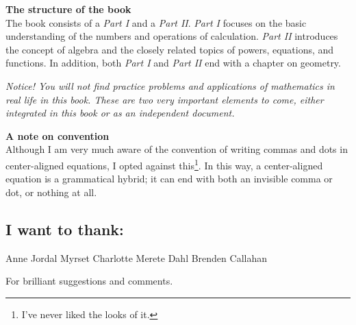 \textbf{The structure of the book}\\
The book consists of a \textsl{Part I} and a \textsl{Part II}. \textsl{Part I} focuses on the basic understanding of the numbers and operations of calculation. \textsl{Part II} introduces the concept of algebra and the closely related topics of powers, equations, and functions. In addition, both \textsl{Part I} and \textsl{Part II} end with a chapter on geometry. \vsk

\textit{Notice! 
You will not find practice problems and applications of mathematics in real life in this book. These are two very important elements to come, either integrated in this book or as an independent document.
} \vsk

\textbf{A note on convention} \\
Although I am very much aware of the convention of writing commas and dots in center-aligned equations, I opted against this\footnote{I've never liked the looks of it.}. In this way, a center-aligned equation is a grammatical hybrid; it can end with both an invisible comma or dot, or nothing at all.

 \vfill
\newpage
\subsection*{I want to thank:}
Anne Jordal Myrset \os
Charlotte Merete Dahl\os
Brenden Callahan \vsk

For brilliant suggestions and comments. \vsk
\vsk
 






